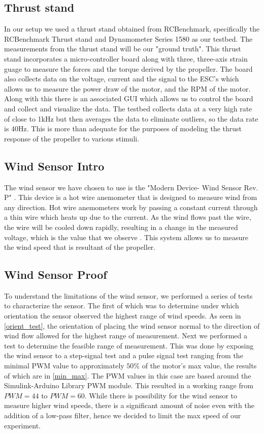 \documentclass[twocolumn]{article}
\begin{document}
	\subsection{Thrust stand}
	In our setup we used a thrust stand obtained from RCBenchmark, specifically the RCBenchmark Thrust stand and Dynamometer Series 1580 \cite{rcb} as our testbed. The measurements from the thrust stand will be our "ground truth". This thrust stand incorporates a micro-controller board along with three, three-axis strain guage to measure the forces and the torque derived by the propeller. The board also collects data on the voltage, current and the signal to the ESC's which allows us to measure the power draw of the motor, and the RPM of the motor. Along with this there is an associated GUI which allows us to control the board and collect and visualize the data. The testbed collects data at a very high rate of close to 1kHz but then averages the data to eliminate outliers, so the data rate is 40Hz. This is more than adequate for the purposes of modeling the thrust response of the propeller to various stimuli. 
	\subsection{Wind Sensor Intro}
	The wind sensor we have chosen to use is the "Modern Device- Wind Sensor Rev. P" \cite{md}. This device is a hot wire anemometer that is designed to measure wind from any direction. Hot wire anemometers work by passing a constant current through a thin wire which heats up due to the current. As the wind flows past the wire, the wire will be cooled down rapidly, resulting in a change in the measured voltage, which is the value that we observe \cite{hot_wire}. This system allows us to measure the wind speed that is resultant of the propeller. 
	\subsection{Wind Sensor Proof}
	To understand the limitations of the wind sensor, we performed a series of tests to characterize the sensor. The first of which was to determine under which orientation the sensor observed the highest range of wind speeds. As seen in \ref{orient_test}, the orientation of placing the wind sensor normal to the direction of wind flow allowed for the highest range of measurement. Next we performed a test to determine the feasible range of measurement. This was done by exposing the wind sensor to a step-signal test and a pulse signal test ranging from the minimal PWM value to approximately $50\%$ of the motor's max value, the results of which are in \ref{min_max}. The PWM values in this case are based around the Simulink-Arduino Library PWM module.  This resulted in a working range from $PWM = 44$ to $PWM = 60$. While there is possibility for the wind sensor to measure higher wind speeds, there is a significant amount of noise even with the addition of a low-pass filter, hence we decided to limit the max speed of our experiment. 
	
\end{document}
